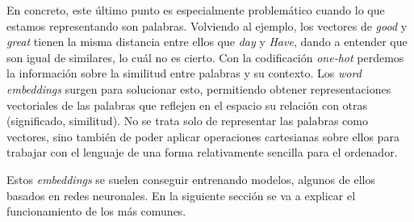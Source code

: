 En concreto, este último punto es especialmente problemático cuando lo que
estamos representando son palabras. Volviendo al ejemplo, los vectores de
\textit{good} y \textit{great} tienen la misma distancia entre ellos que
\textit{day} y \textit{Have}, dando a entender que son igual de similares, lo
cuál no es cierto. Con la codificación \textit{one-hot} perdemos la información
sobre la similitud entre palabras y su contexto. Los \textit{word embeddings}
surgen para solucionar esto, permitiendo obtener representaciones vectoriales de
las palabras que reflejen en el espacio su relación con otras (significado,
similitud). No se trata solo de representar las palabras como vectores, sino
también de poder aplicar operaciones cartesianas sobre ellos para trabajar con
el lenguaje de una forma relativamente sencilla para el ordenador.

Estos \textit{embeddings} se suelen conseguir entrenando modelos, algunos de
ellos basados en redes neuronales. En la siguiente sección se va a explicar el
funcionamiento de los más comunes.
